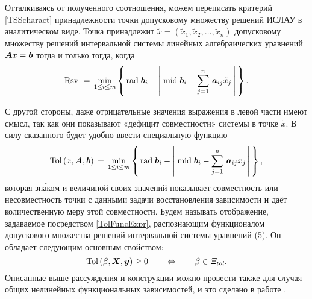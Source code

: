 \documentclass[a5paper,openany]{book}
\newcommand{\mbf}[1]{\protect\text{\boldmath$#1$}}
\newcommand{\m}{\mathrm{mid}\;}
\newcommand{\Tol}{\mathrm{Tol}\,}
\newcommand{\Rsv}{\mathrm{Rsv}\,}
\newcommand{\TSS}{\varXi_\mathit{\hspace{-0.5pt}tol}}
\renewcommand{\r}{\mathrm{rad}\;}
\begin{document}
Отталкиваясь от полученного соотношения, можем переписать критерий \eqref{TSScharact} 
принадлежности точки допусковому множеству решений ИСЛАУ в аналитическом виде. Точка 
принадлежит $\tilde{x} = (\tilde{x}_{1}, \tilde{x}_{2}, \ldots, \tilde{x}_{n})$ допусковому 
множеству решений интервальной системы линейных алгебраических уравнений $\mbf{A}x = \mbf{b}$ 
тогда и только тогда, когда 
\begin{equation*} 
\Rsv \,  = \,\min_{1\leq i\leq m}
  \left\{ \,\r\mbf{b}_i - \left|\; \m\mbf{b}_i - \sum_{j=1}^n 
  \,\mbf{a}_{ij} \tilde{x}_{j} \,\right| \,\right\}.  
\end{equation*} 
   
С другой стороны, даже отрицательные значения выражения в левой части имеют смысл, так как 
они показывают «дефицит совместности» системы в точке $\tilde{x}$. В силу сказанного будет 
удобно ввести специальную функцию 
\begin{equation}
\label{TolFuncExpr} 
\index{распознающий функционал} 
\Tol(x, \mbf{A}, \mbf{b})\,  = \,\min_{1\leq i\leq m}
   \left\{ \,\r\mbf{b}_i - \left|\; \m\mbf{b}_i - \sum_{j=1}^n 
   \,\mbf{a}_{ij} x_{j} \,\right| \,\right\}, 
\end{equation} 
которая зн\'{а}ком и величиной своих значений показывает совместность или несовместность 
точки с данными задачи восстановления зависимости и даёт количественную меру этой 
совместности. Будем называть отображение, задаваемое посредством \eqref{TolFuncExpr}, 
распознающим функционалом допускового множества решений  интервальной системы уравнений (5). 
Он обладает следующим основным свойством:  
\begin{equation*}  
\Tol (\beta, \mbf{X}, \mbf{y}) \geq 0  
   \qquad\Leftrightarrow\qquad \beta\in\TSS. 
\end{equation*} 
Описанные выше рассуждения и конструкции можно провести также для случая общих нелинейных функциональных зависимостей, и это сделано в работе \cite{SShary2022}. 
    
\end{document}
